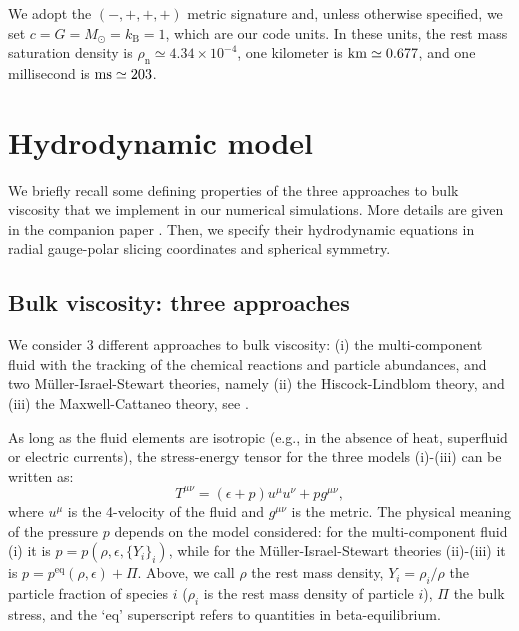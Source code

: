 \documentclass[aps,prd,twocolumn,a4paper,floatfix,nofootbib,superscriptaddress,nofootinbib]{revtex4}
\newcommand{\rn}{\mathrm{n}}
\newcommand{\req}{\mathrm{eq}}
\begin{document}
We adopt the $(-,+,+,+)$ metric signature and, unless otherwise specified,
we set $c=G=M_\odot=k_\mathrm{B}=1$, which are our code units.  In these units,
the rest mass saturation density is $\rho_\rn\simeq 4.34\times10^{-4}$,
one kilometer is $\unit[]{km}\simeq0.677$, and one millisecond is
$\unit[]{ms}\simeq203$.

\section{Hydrodynamic model}
\label{sec:model}

We briefly recall some defining properties of the three approaches to bulk viscosity that we implement in our numerical simulations.
More details are given in the companion paper \citep{Camelio22a}.
Then, we specify their hydrodynamic equations in radial gauge-polar slicing coordinates and spherical symmetry.

\subsection{Bulk viscosity: three approaches}
\label{ssec:bulk}

We consider 3 different approaches to bulk viscosity: (i) the multi-component
fluid with the tracking of the chemical reactions and particle
abundances, and two M\"uller-Israel-Stewart theories, namely (ii) the Hiscock-Lindblom theory, and (iii) the Maxwell-Cattaneo
theory, see \citet{Camelio22a}.

As long as the fluid elements are isotropic (e.g., in the absence of heat, superfluid or electric currents), the stress-energy tensor for the three models (i)-(iii) can be written as:
%
\begin{equation}
\label{eq:tmunu}
T^{\mu\nu}=(\epsilon + p)u^\mu u^\nu + pg^{\mu\nu},
\end{equation}
%
where $u^\mu$ is the 4-velocity of the fluid and $g^{\mu\nu}$ is the metric.
The physical meaning of the pressure $p$ depends on the model considered: for the
multi-component fluid (i) it is
$p=p(\rho,\epsilon,\{Y_i\}_i)$, while for the M\"uller-Israel-Stewart theories (ii)-(iii) it is
$p=p^\req(\rho,\epsilon)+\Pi$.  
Above, we call $\rho$ the rest mass density, $Y_i=\rho_i/\rho$
the particle fraction of species $i$ ($\rho_i$ is the rest mass density of
particle $i$), $\Pi$ the bulk stress, and the `eq' superscript refers to
quantities in beta-equilibrium.
\end{document}
